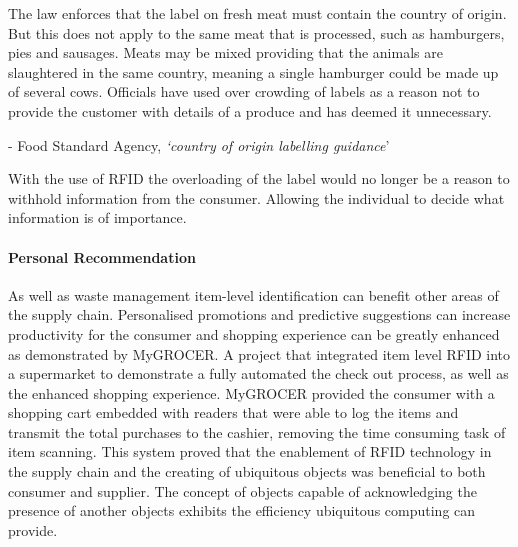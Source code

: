 \documentclass[a4paper, 11pt]{article}
\begin{document}
The law enforces that the label on fresh meat must contain the country of origin. But this does not apply to the same meat that is processed, such as hamburgers, pies and sausages. Meats may be mixed providing that the animals are slaughtered in the same country, meaning a single hamburger could be made up of several cows.\cite{FSA} Officials have used over crowding of labels as a reason not to provide the customer with details of a produce and has deemed it unnecessary. 

\vspace{\baselineskip}
\begin{quoting}
- Food Standard Agency, \emph{`country of origin labelling guidance}'\cite{FSA}
\end{quoting}
\vspace{\baselineskip}

With the use of RFID the overloading of the label would no longer be a reason to withhold information from the consumer. Allowing the individual to decide what information is of importance.


\paragraph{Personal Recommendation} As well as waste management item-level identification can benefit other areas of the supply chain. Personalised promotions and predictive suggestions can increase productivity for the consumer and shopping experience can be greatly enhanced as demonstrated by MyGROCER\cite{myGrocer}. A project that integrated item level RFID into a supermarket to demonstrate a fully automated the check out process, as well as the enhanced shopping experience. MyGROCER provided the consumer with a shopping cart embedded with readers that were able to log the items and transmit the total purchases to the cashier, removing the time consuming task of item scanning. This system proved that the enablement of RFID technology in the supply chain and the creating of ubiquitous objects was beneficial to both consumer and supplier.\cite{pervasiveComp} The concept of objects capable of acknowledging the presence of another objects exhibits the efficiency ubiquitous computing can provide.
\end{document}
